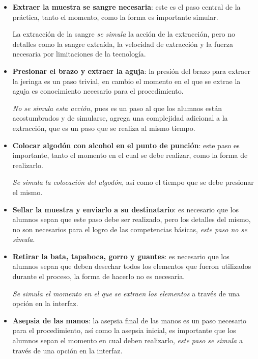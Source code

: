 \begin{itemize}
\item \textbf{Extraer la muestra se sangre necesaria}: este es el paso central
    de la práctica, tanto el momento, como la forma es importante simular.

    La extracción de la sangre \emph{se simula} la acción de la extracción, pero
    no detalles como la sangre extraída, la velocidad de extracción y la fuerza
    necesaria por limitaciones de la tecnología.

\item \textbf{Presionar el brazo y extraer la aguja}: la presión del brazo para
    extraer la jeringa es un paso trivial, en cambio el momento en el que se
    extrae la aguja es conocimiento necesario para el procedimiento.

    \emph{No se simula esta acción}, pues es un paso al que los alumnos están
    acostumbrados y de simularse, agrega una complejidad adicional a la
    extracción, que es un paso que se realiza al mismo tiempo.

\item \textbf{Colocar algodón con alcohol en el punto de punción}: este paso es
    importante, tanto el momento en el cual se debe realizar, como la forma de
    realizarlo.

    \emph{Se simula la colocación del algodón}, así como el tiempo que se debe
    presionar el mismo.

\item \textbf{Sellar la muestra y enviarlo a su destinatario}: es necesario que
    los alumnos sepan que este paso debe ser realizado, pero los detalles del
    mismo, no son necesarios para el logro de las competencias básicas,
    \emph{este paso no se simula}.


\item \textbf{Retirar la bata, tapaboca, gorro y guantes}: es necesario que los
    alumnos sepan que deben desechar todos los elementos que fueron utilizados
    durante el proceso, la forma de hacerlo no es necesaria.

    \emph{Se simula el momento en el que se extraen los elementos} a través de
    una opción en la interfaz.

\item \textbf{Asepsia de las manos}: la asepsia final de las manos es un paso
    necesario para el procedimiento, así como la asepsia inicial, es importante
    que los alumnos sepan el momento en cual deben realizarlo, \emph{este paso
        se simula} a través de una opción en la interfaz.

\end{itemize}

